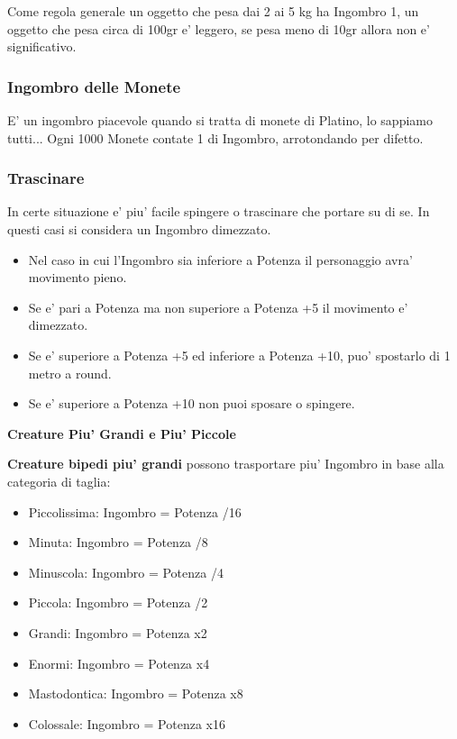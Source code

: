 \documentclass[a4paper,11pt,twoside,openany]{book}
\begin{document}
{Come regola generale un oggetto che pesa dai 2 ai 5 kg ha Ingombro 1, un oggetto che pesa circa di 100gr e' leggero, se pesa meno di 10gr allora non e' significativo.

\subsubsection{Ingombro delle Monete}

E' un ingombro piacevole quando si tratta di monete di Platino, lo sappiamo tutti...
Ogni 1000 Monete contate 1 di Ingombro, arrotondando per difetto.


\subsubsection{Trascinare}

In certe situazione e' piu' facile spingere o trascinare che portare su di se.
In questi casi si considera un Ingombro dimezzato.

\begin{itemize}
	\item Nel caso in cui l'Ingombro sia inferiore a Potenza il personaggio avra' movimento pieno.

\item Se e' pari a Potenza ma non superiore a Potenza +5 il movimento e' dimezzato.

\item Se e' superiore a Potenza +5 ed inferiore a Potenza +10, puo' spostarlo di 1 metro a round.

\item Se e' superiore a Potenza +10 non puoi sposare o spingere.
\end{itemize}


\textbf{Creature Piu' Grandi e Piu' Piccole}

\textbf{Creature bipedi piu' grandi} possono trasportare piu' Ingombro in base alla categoria di taglia:

\begin{itemize}
	\item Piccolissima: Ingombro = Potenza /16
	\item Minuta: Ingombro = Potenza /8
	\item Minuscola: Ingombro = Potenza /4
	\item Piccola: Ingombro = Potenza /2
	\item Grandi: Ingombro = Potenza x2
	\item Enormi: Ingombro = Potenza x4
	\item Mastodontica: Ingombro = Potenza x8
	\item Colossale: Ingombro = Potenza x16
\end{itemize}

}
\end{document}

